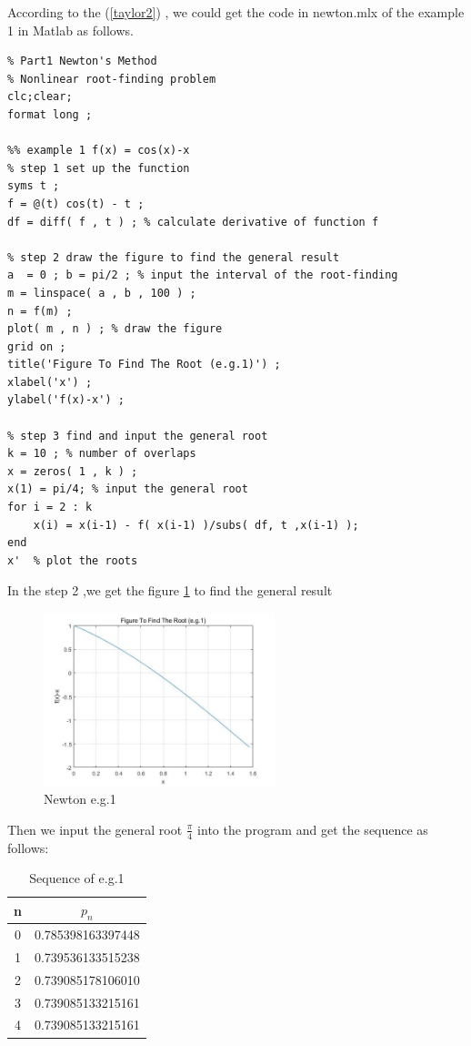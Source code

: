 \documentclass{article}
\begin{document}
According to the (\ref{taylor2}) , we could get the code in newton.mlx of the example 1 in Matlab as follows.

\begin{lstlisting}
% Part1 Newton's Method
% Nonlinear root-finding problem
clc;clear;
format long ;

%% example 1 f(x) = cos(x)-x
% step 1 set up the function
syms t ;
f = @(t) cos(t) - t ;
df = diff( f , t ) ; % calculate derivative of function f

% step 2 draw the figure to find the general result
a  = 0 ; b = pi/2 ; % input the interval of the root-finding 
m = linspace( a , b , 100 ) ; 
n = f(m) ;
plot( m , n ) ; % draw the figure
grid on ;
title('Figure To Find The Root (e.g.1)') ;
xlabel('x') ; 
ylabel('f(x)-x') ;

% step 3 find and input the general root
k = 10 ; % number of overlaps
x = zeros( 1 , k ) ;
x(1) = pi/4; % input the general root
for i = 2 : k
    x(i) = x(i-1) - f( x(i-1) )/subs( df, t ,x(i-1) );
end
x'  % plot the roots
\end{lstlisting}

In the step 2 ,we get the figure \ref{newton1} to find the general result

\begin{figure}[h!]
\centering
\includegraphics[width=0.6\textwidth]{newton.jpg}
\caption{Newton e.g.1}
\label{newton1}
\end{figure}

Then we input the general root $\frac{\pi}{4}$ into the program and get the sequence as follows:


\begin{table}[h!]
\centering
\begin{center}
 \begin{tabular}{c c} 
 \hline
 \hline
n & $p_n$ \\\hline
0 & 0.785398163397448\\ \hline
1 & 0.739536133515238\\ \hline
2 & 0.739085178106010\\ \hline
3 & 0.739085133215161\\ \hline
4 & 0.739085133215161\\ 
\hline
\hline
\end{tabular}
\end{center}
\caption{Sequence of e.g.1}
\label{newton table1}
\end{table}
\end{document}
